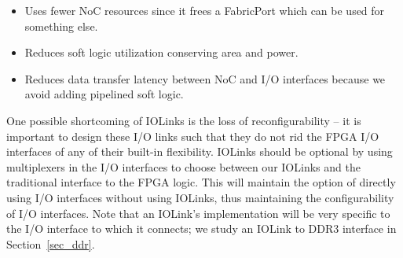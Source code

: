 %
\begin{itemize}
    \item Uses fewer NoC resources since it frees a FabricPort which can be used for something else.
    \item Reduces soft logic utilization conserving area and power.
    \item Reduces data transfer latency between NoC and I/O interfaces because we avoid adding pipelined soft logic.
\end{itemize}
%

One possible shortcoming of IOLinks is the loss of reconfigurability -- it is important to design these I/O links such that they do not rid the FPGA I/O interfaces of any of their built-in flexibility.
IOLinks should be optional by using multiplexers in the I/O interfaces to choose between our IOLinks and the traditional interface to the FPGA logic.
This will maintain the option of directly using I/O interfaces without using IOLinks, thus maintaining the configurability of I/O interfaces.
Note that an IOLink's implementation will be very specific to the I/O interface to which it connects; we study an IOLink to DDR3 interface in Section~\ref{sec_ddr}.

%
%
